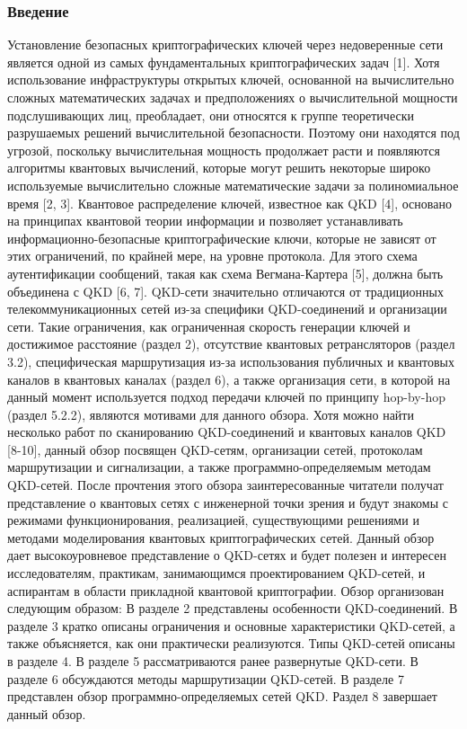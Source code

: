 \subsubsection{Введение}
Установление безопасных криптографических ключей через недоверенные сети является одной из самых фундаментальных криптографических задач [1]. Хотя использование инфраструктуры открытых ключей, основанной на вычислительно сложных математических задачах и предположениях о вычислительной мощности подслушивающих лиц, преобладает, они относятся к группе теоретически разрушаемых решений вычислительной безопасности.
Поэтому они находятся под угрозой, поскольку вычислительная мощность продолжает расти и появляются алгоритмы квантовых вычислений, которые могут решить некоторые широко используемые вычислительно сложные математические задачи за полиномиальное время [2, 3]. Квантовое распределение ключей, известное как QKD [4], основано на принципах квантовой теории информации и позволяет устанавливать информационно-безопасные криптографические ключи, которые не зависят от этих ограничений, по крайней мере, на уровне протокола. Для этого схема аутентификации сообщений, такая как схема Вегмана-Картера [5], должна быть объединена с QKD [6, 7].
QKD-сети значительно отличаются от традиционных телекоммуникационных сетей из-за специфики QKD-соединений и организации сети. Такие ограничения, как ограниченная скорость генерации ключей и достижимое расстояние (раздел 2), отсутствие квантовых ретрансляторов (раздел 3.2), специфическая маршрутизация из-за использования публичных и квантовых каналов в квантовых каналах (раздел 6), а также организация сети, в которой на данный момент используется подход передачи ключей по принципу hop-by-hop (раздел 5.2.2), являются мотивами для данного обзора. Хотя можно найти несколько работ по сканированию QKD-соединений и квантовых каналов QKD [8-10], данный обзор посвящен QKD-сетям, организации сетей, протоколам маршрутизации и сигнализации, а также программно-определяемым методам QKD-сетей. После прочтения этого обзора заинтересованные читатели получат представление о квантовых сетях с инженерной точки зрения и будут знакомы с режимами функционирования, реализацией, существующими решениями и методами моделирования квантовых криптографических сетей. Данный обзор дает высокоуровневое представление о QKD-сетях и будет полезен и интересен исследователям, практикам, занимающимся проектированием QKD-сетей, и аспирантам в области прикладной квантовой криптографии.
Обзор организован следующим образом: В разделе 2 представлены особенности QKD-соединений. В разделе 3 кратко описаны ограничения и основные характеристики QKD-сетей, а также объясняется, как они практически реализуются. Типы QKD-сетей описаны в разделе 4. В разделе 5 рассматриваются ранее развернутые QKD-сети. В разделе 6 обсуждаются методы маршрутизации QKD-сетей. В разделе 7 представлен обзор программно-определяемых сетей QKD. Раздел 8 завершает данный обзор.

